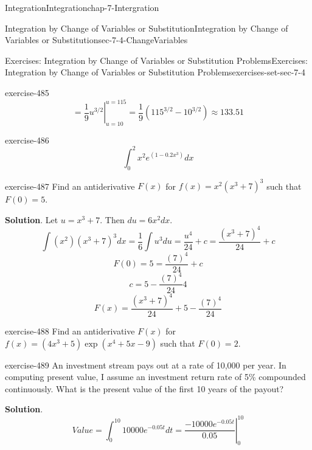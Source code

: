 \documentclass[oneside,10pt,]{book}
\numberwithin{equation}{section}
\begin{document}
\begin{chapterptx}{Integration}{}{Integration}{}{}{chap-7-Intergration}
\begin{sectionptx}{Integration by Change of Variables or Substitution}{}{Integration by Change of Variables or Substitution}{}{}{sec-7-4-ChangeVariables}
\begin{exercises-subsection-numberless}{Exercises: Integration by Change of Variables or Substitution Problems}{}{Exercises: Integration by Change of Variables or Substitution Problems}{}{}{exercises-set-sec-7-4}
\begin{divisionexercise}{17}{}{}{exercise-485}
\begin{equation*}
\end{equation*}
%
\begin{equation*}
=\left.\frac{1}{9}u^{3/2}\right|_{u=10}^{u=115}
=\frac{1}{9} (115^{3/2}-10^{3/2})\approx 133.51
\end{equation*}
\end{divisionexercise}%
\begin{divisionexercise}{18}{}{}{exercise-486}%
%
\begin{equation*}
\int_0^2 x^2 e^{(1-0.2x^3)} dx 
\end{equation*}
\end{divisionexercise}%
\begin{divisionexercise}{19}{}{}{exercise-487}%
\hypertarget{p-2865}{}%
Find an antiderivative \(F(x)\) for \(f(x)=x^2(x^3+7)^3\) such that \(F(0)=5\).%
\par\smallskip%
\noindent\textbf{Solution}.\hypertarget{solution-247}{}\quad%
\hypertarget{p-2866}{}%
Let \(u=x^3+7\).  Then \(du=6x^2 dx\).%
%
\begin{equation*}
\int (x^2 ) (x^3+7)^3 dx=\frac{1}{6} \int u^3 du=\frac{u^4}{24}+c=\frac{(x^3+7)^4}{24}+c
\end{equation*}
%
\begin{equation*}
F(0)=5=\frac{(7)^4}{24}+c
\end{equation*}
%
\begin{equation*}
c=5-\frac{(7)^4}{24}4
\end{equation*}
%
\begin{equation*}
F(x)=\frac{(x^3+7)^4}{24}+5-\frac{(7)^4}{24}
\end{equation*}
\end{divisionexercise}%
\begin{divisionexercise}{20}{}{}{exercise-488}%
\hypertarget{p-2867}{}%
Find an antiderivative \(F(x)\)  for \(f(x)=(4x^3+5)\exp(x^4+5x-9)\) such that \(F(0)=2\).%
\end{divisionexercise}%
\begin{divisionexercise}{21}{}{}{exercise-489}%
\hypertarget{p-2868}{}%
An investment stream pays out at a rate of \textdollar{}10,000 per year.  In computing present value, I assume an investment return rate of 5\% compounded continuously.  What is the present value of the first 10 years of the payout?%
\par\smallskip%
\noindent\textbf{Solution}.\hypertarget{solution-248}{}\quad%
%
\begin{equation*}
Value=\int_0^{10}10000e^{-0.05t} dt
=\left.\frac{-10000e^{-0.05t}}{0.05}\right|_0^{10}
\end{equation*}

\end{divisionexercise}
\end{exercises-subsection-numberless}
\end{sectionptx}
\end{chapterptx}
\end{document}
